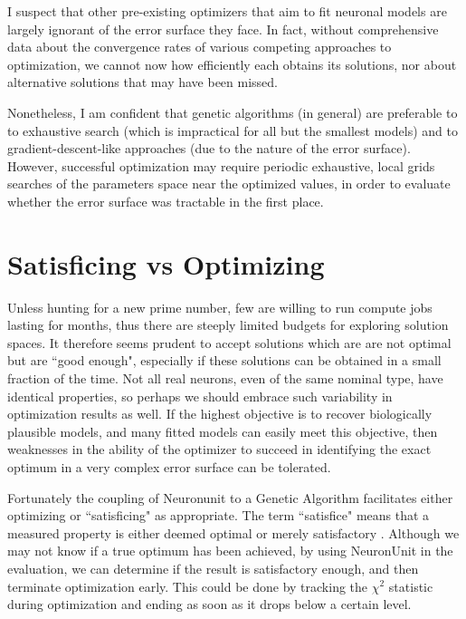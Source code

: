 I suspect that other pre-existing optimizers that aim to fit neuronal models are largely ignorant of the error surface they face.
In fact, without comprehensive data about the convergence rates of various competing approaches to optimization, we cannot now how efficiently each obtains its solutions, nor about alternative solutions that may have been missed.

Nonetheless, I am confident that genetic algorithms (in general) are preferable to to exhaustive search (which is impractical for all but the smallest models) and to gradient-descent-like approaches (due to the nature of the error surface).
However, successful optimization may require periodic exhaustive, local grids searches of the parameters space near the optimized values, in order to evaluate whether the error surface was tractable in the first place.

\section{Satisficing vs Optimizing}
Unless hunting for a new prime number, few are willing to run compute jobs lasting for months, thus there are steeply limited budgets for exploring solution spaces. It therefore seems prudent to accept solutions which are are not optimal but are ``good enough", especially if these solutions can be obtained in a small fraction of the time.
Not all real neurons, even of the same nominal type, have identical properties, so perhaps we should embrace such variability in optimization results as well.
If the highest objective is to recover biologically plausible models, and many fitted models can easily meet this objective, then weaknesses in the ability of the optimizer to succeed in identifying the exact optimum in a very complex error surface can be tolerated.

Fortunately the coupling of Neuronunit to a Genetic Algorithm facilitates either optimizing or ``satisficing" as appropriate.
The term ``satisfice" means that a measured property is either deemed optimal or merely satisfactory \citep{simon1956rational}.
Although we may not know if a true optimum has been achieved, by using NeuronUnit in the evaluation, we can determine if the result is satisfactory enough, and then terminate optimization early.
This could be done by tracking the $\chi^2$ statistic during optimization and ending as soon as it drops below a certain level.
